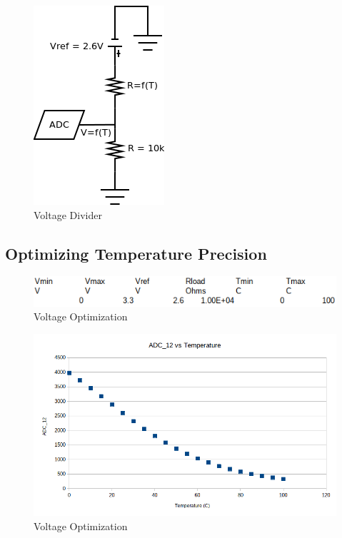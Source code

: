\documentclass{hitec}
\begin{document}
\begin{figure}[H]
    \centering
    \includegraphics[scale=0.6]{voltage_divider.png}
    \caption{Voltage Divider}
    \label{fig:voltage_divider}
\end{figure}


\subsection{Optimizing Temperature Precision}

\begin{figure}[H]
    \centering
    \includegraphics[scale=0.9]{voltage_optimizations}
    \caption{Voltage Optimization}
    \label{fig:voltage_optimizations}
\end{figure}

\begin{figure}[H]
    \centering
    \includegraphics[scale=0.6]{adc12_vs_temperature.png}
    \caption{Voltage Optimization}
    \label{fig:voltage_optimizations}
\end{figure}
\end{document}
